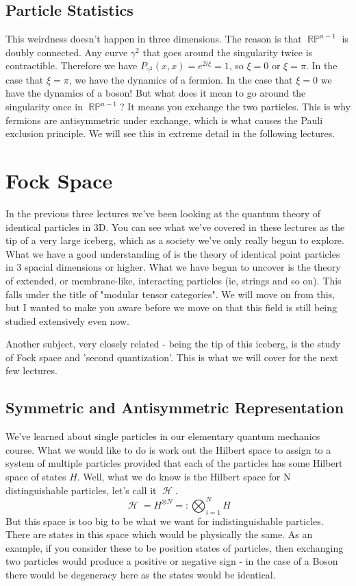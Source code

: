 \documentclass{article}
\DeclareMathOperator{\Hh}{{\mathcal{H}}}
\DeclareMathOperator{\RP}{\mathbb{RP}}
\begin{document}
\subsection{Particle Statistics}

This weirdness doesn't happen in three dimensions. The reason is that $\RP^{n-1}$ is doubly connected. Any curve $\gamma^2$ that goes around the singularity twice is contractible. Therefore we have $P_{\gamma^2}(x,x) = e^{2i\xi}=1$, so $\xi = 0$ or $\xi = \pi$. In the case that $\xi = \pi$, we have the dynamics of a fermion. In the case that $\xi = 0$ we have the dynamics of a boson! But what does it mean to go around the singularity once in $\RP^{n-1}$? It means you exchange the two particles. This is why fermions are antisymmetric under exchange, which is what causes the Pauli exclusion principle. We will see this in extreme detail in the following lectures.

\section{Fock Space}
In the previous three lectures we've been looking at the quantum theory of identical particles in 3D. You can see what we've covered in these lectures as the tip of a very large iceberg, which as a society we've only really begun to explore. What we have a good understanding of is the theory of identical point particles in 3 spacial dimensions or higher. What we have begun to uncover is the theory of extended, or membrane-like, interacting particles (ie, strings and so on). This falls under the title of "modular tensor categories". We will move on from this, but I wanted to make you aware before we move on that this field is still being studied extensively even now.

Another subject, very closely related - being the tip of this iceberg, is the study of Fock space and 'second quantization'. This is what we will cover for the next few lectures.

\subsection{Symmetric and Antisymmetric Representation}

We've learned about single particles in our elementary quantum mechanics course. What we would like to do is work out the Hilbert space to assign to a system of multiple particles provided that each of the particles has some Hilbert space of states $H$. Well, what we do know is the Hilbert space for N distinguishable particles, let's call it $\Hh$.
\begin{equation}
\Hh = H^{\otimes N} =: \bigotimes_{i=1}^N H
\end{equation}
But this space is too big to be what we want for indistinguishable particles. There are states in this space which would be physically the same. As an example, if you consider these to be position states of particles, then exchanging two particles would produce a positive or negative sign - in the case of a Boson there would be degeneracy here as the states would be identical.
\end{document}
